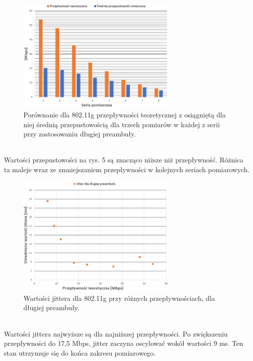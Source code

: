 \documentclass[12pt, a4paper, oneside]{article}
\begin{document}
\begin{figure}[h!]
\centering
\includegraphics[width=0.7\textwidth]{pics/f4.png}
\caption{Porównanie dla 802.11g przepływności teoretycznej z osiągniętą dla niej średnią przepustowością dla trzech pomiarów w każdej z serii przy zastosowaniu długiej preambuły.}
\end{figure}\\
\indent Wartości przepustowości na rys. 5 są znacząco niższe niż przepływność. Różnica ta maleje wraz ze zmniejszaniem przepływności w kolejnych seriach pomiarowych.
\begin{figure}[h!]
\centering
\includegraphics[width=0.7\textwidth]{pics/f6.png}
\caption{Wartości jittera dla 802.11g przy różnych przepływnościach, dla długiej preambuły.}
\end{figure}\\
\indent Wartości jittera najwyższe są dla najniższej przepływności. Po zwiększeniu przepływności do 17,5 Mbps, jitter zaczyna oscylować wokół wartości 9 ms. Ten stan utrzymuje się do końca zakresu pomiarowego.
\end{document}
